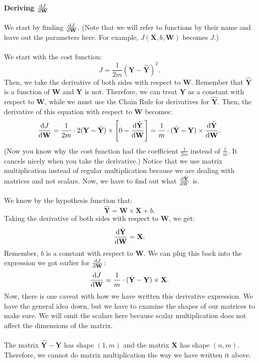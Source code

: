 \documentclass{article}
\begin{document}
\paragraph{Deriving $\diff{J}{\textbf{W}}$} We start by finding $\diff{J}{\textbf{W}}$. (Note that we will refer to functions by their name and leave out the parameters here. For example, $J(\textbf{X},b,\textbf{W})$ becomes $J$.) 
\\
\\
We start with the cost function:
\[J=\frac{1}{2m} (\textbf{Y}-\hat{\textbf{Y}})^2.\]
Then, we take the derivative of both sides with respect to \textbf{W}. Remember that $\hat{\textbf{Y}}$ is a function of \textbf{W} and \textbf{Y} is not. Therefore, we can treat \textbf{Y} as a constant with respect to \textbf{W}, while we must use the Chain Rule for derivatives for $\hat{\textbf{Y}}$. Then, the derivative of this equation with respect to \textbf{W} becomes:
\[\diff{J}{\textbf{W}}=\frac{1}{2m}\cdot 2(\textbf{Y}-\hat{\textbf{Y}})\times \left[0-\diff{\hat{\textbf{Y}}}{\textbf{W}}\right]=\frac{1}{m}\cdot (\hat{\textbf{Y}}-\textbf{Y})\times \diff{\hat{\textbf{Y}}}{\textbf{W}}.\]
(Now you know why the cost function had the coefficient $\frac{1}{2m}$ instead of $\frac{1}{m}$. It cancels nicely when you take the derivative.) Notice that we use matrix multiplication instead of regular multiplication because we are dealing with matrices and not scalars. Now, we have to find out what $\diff{\hat{\textbf{Y}}}{W}$ is.
\\
\\
We know by the hypothesis function that:
\[\hat{\textbf{Y}}=\textbf{W}\times \textbf{X} + b.\]
Taking the derivative of both sides with respect to \textbf{W}, we get:
\[\diff{\hat{\textbf{Y}}}{\textbf{W}}=\textbf{X}.\]
Remember, $b$ is a constant with respect to \textbf{W}. We can plug this back into the expression we got earlier for $\diff{J}{\textbf{W}}$:
\[\diff{J}{\textbf{W}}=\frac{1}{m}\cdot (\hat{\textbf{Y}}-\textbf{Y})\times \textbf{X}.\]
Now, there is one caveat with how we have written this derivative expression. We have the general idea down, but we have to examine the shapes of our matrices to make sure. We will omit the scalars here because scalar multiplication does not affect the dimensions of the matrix. 
\\
\\
The matrix $\hat{\textbf{Y}}-\textbf{Y}$ has shape $(1,m)$ and the matrix \textbf{X} has shape $(n,m)$. Therefore, we cannot do matrix multiplication the way we have written it above. 
\\
\end{document}
